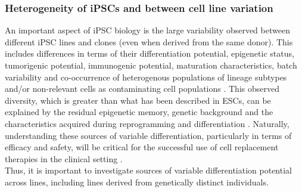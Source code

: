 \subsubsection{Heterogeneity of iPSCs and between cell line variation}

An important aspect of iPSC biology is the  large variability observed between different iPSC lines and clones (even when derived from the same donor). 
This includes differences
in terms of their differentiation potential, epigenetic status, tumorigenic potential, immunogenic potential, maturation characteristics, batch variability and co-occurrence of heterogenous populations of lineage subtypes and/or non-relevant cells as contaminating cell populations \cite{buganim2013mechanisms}.
This observed diversity, which is greater than what has been described in ESCs, can be explained by the residual epigenetic memory, genetic background and the characteristics acquired during reprogramming and differentiation \cite{kim2010epigenetic, polo2010cell, rouhani2014genetic}.
Naturally, understanding these sources of variable differentiation, particularly in terms of efficacy and safety, will be critical for the successful use of cell replacement therapies in the clinical setting \cite{buganim2013mechanisms}. \\

Thus, it is important to investigate sources of variable differentiation potential across lines, including lines derived from genetically distinct individuals.





